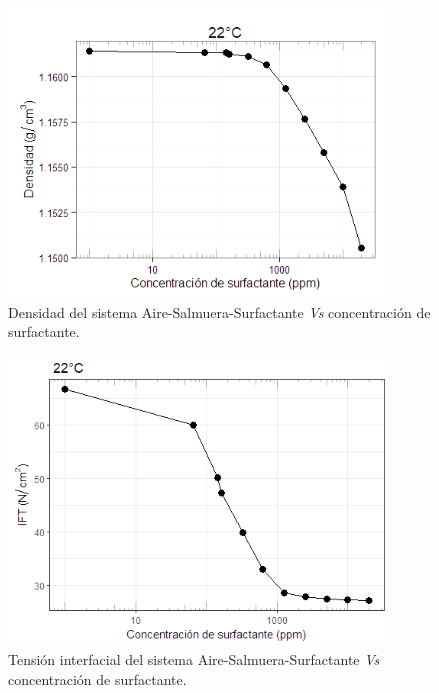 \begin{figure}
    \centering
    \includegraphics[width=0.9\textwidth]{R_plot/Rplot23.png}
    \caption[Densidad del sistema Aire-S-S.]{Densidad del sistema Aire-Salmuera-Surfactante \emph{Vs} concentración de surfactante.}
    \label{fig:denAireSS}
\end{figure}

\begin{figure}
    \centering
    \includegraphics[width=0.9\textwidth]{R_plot/Rplot24.png}
    \caption[IFT del sistema Aire-S-S.]{Tensión interfacial del sistema Aire-Salmuera-Surfactante \emph{Vs} concentración de surfactante.}
    \label{fig:IFTAireSS}
\end{figure}



